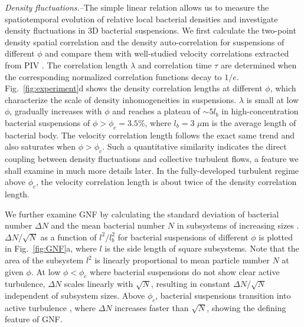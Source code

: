 \documentclass[twocolumn,aps,prl,amsmath,amssymb,longbibliography]{revtex4-2}
\begin{document}
\textit{Density fluctuations.}--The simple linear relation allows us to measure the spatiotemporal evolution of relative local bacterial densities and investigate density fluctuations in 3D bacterial suspensions. We first calculate the two-point density spatial correlation and the density auto-correlation for suspensions of different $\phi$ and compare them with well-studied velocity correlations extracted from PIV \cite{Liu2020}.
The correlation length $\lambda$ and correlation time $\tau$ are determined when the corresponding normalized correlation functions decay to $1/e$. Fig.~\ref{fig:experiment}d shows the density correlation lengths at different $\phi$, which characterize the scale of density inhomogeneities in suspensions.
$\lambda$ is small at low $\phi$, gradually increases with $\phi$ and reaches a plateau of $\sim 5l_b$ in high-concentration bacterial suspensions of $\phi > \phi_c = 3.5\%$, where $l_b=3$ $\mu$m is the average length of bacterial body. The velocity correlation length follows the exact same trend and also saturates when $\phi > \phi_c$. Such a quantitative similarity indicates the direct coupling between density fluctuations and collective turbulent flows, a feature we shall examine in much more details later. In the fully-developed turbulent regime above $\phi_c$, the velocity correlation length is about twice of the density correlation length.

We further examine GNF by calculating the standard deviation of bacterial number $\Delta N$ and the mean bacterial number $N$ in subsystems of increasing sizes \cite{Liu2020}. $\Delta N / \sqrt N$ as a function of $l^2/l_b^2$ for bacterial suspensions of different $\phi$ is plotted in Fig.~\ref{fig:GNF}a, where $l$ is the side length of square subsystems. Note that the area of the subsystem $l^2$ is linearly proportional to mean particle number $N$ at given $\phi$. At low $\phi<\phi_c$ where bacterial suspensions do not show clear active turbulence, $\Delta N$ scales linearly with $\sqrt N$, resulting in constant $\Delta N / \sqrt N$ independent of subsystem sizes. Above $\phi_c$, bacterial suspensions transition into active turbulence \cite{Peng2020}, where $\Delta N$ increases faster than $\sqrt N$, showing the defining feature of GNF.
\end{document}
